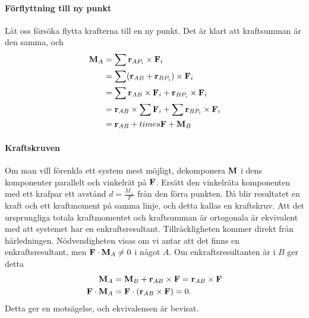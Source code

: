 \paragraph{Förflyttning till ny punkt}
Låt oss försöka flytta krafterna till en ny punkt. Det är klart att kraftsumman är den samma, och
\begin{align*}
	\vect{M}_A &= \sum\vect{r}_{AP_i}\times\vect{F}_i \\
	           &= \sum(\vect{r}_{AB} + \vect{r}_{BP_i})\times\vect{F}_i \\
	           &= \sum\vect{r}_{AB}\times\vect{F}_i + \vect{r}_{BP_i}\times\vect{F}_i \\
	           &= \vect{r}_{AB}\times\sum\vect{F}_i + \sum\vect{r}_{BP_i}\times\vect{F}_i \\
	           &= \vect{r}_{AB}+times\vect{F} + \vect{M}_{B}
\end{align*}

\paragraph{Kraftskruven}
Om man vill förenkla ett system mest möjligt, dekomponera $\vect{M}$ i dens komponenter parallelt och vinkelrät på $\vect{F}$. Ersätt den vinkelräta komponenten med ett krafpar ett avstånd $d = \frac{M_\perp}{F}$ från den förra punkten. Då blir resultatet en kraft och ett kraftmoment på samma linje, och detta kallas en kraftskruv. Att det ursprungliga totala kraftmomentet och kraftsumman är ortogonala är ekvivalent med att systemet har en enkraftsresultant. Tillräckligheten kommer direkt från härledningen. Nödvendigheten visas om vi antar att det finns en enkraftsresultant, men $\vect{F}\cdot\vect{M}_A\neq 0$ i något $A$. Om enkraftsresultanten är i $B$ ger detta
\begin{align*}
	\vect{M}_A              &= \vect{M}_B + \vect{r}_{AB}\times\vect{F} = \vect{r}_{AB}\times\vect{F} \\
	\vect{F}\cdot\vect{M}_A &= \vect{F}\cdot(\vect{r}_{AB}\times\vect{F}) = 0.
\end{align*}
Detta ger en motsägelse, och ekvivalensen är bevisat.